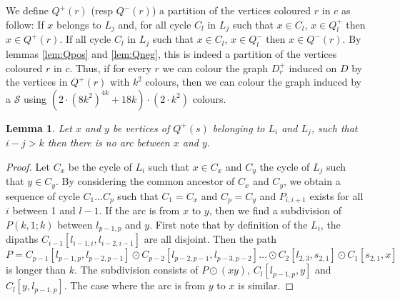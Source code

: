 \documentclass[utf8,10pt]{article}
\theoremstyle{plain}
\newtheorem{lemma}[theorem]{Lemma}
\theoremstyle{definition}
\theoremstyle{remark}
\newcommand{\dr}{ k^2}
\newcommand{\col}{(8k^2)^{4k}}
\begin{document}
%
We define $Q^+(r)$ (resp $Q^-(r)$) a partition of the vertices coloured $r$ in $c$ as follow:
If $x$ belongs to $L_j$ and, for all cycle $C_l$ in $L_j$ such that $x \in C_l$, $x \in Q^+_l$ then $x \in Q^+(r)$.
If all cycle $C_l$ in $L_j$ such that $x \in C_l$, $x \in Q^-_l$ then $x \in Q^-(r)$.
By lemmas \ref{lem:Qpos} and \ref{lem:Qneg}, this is indeed a partition of the vertices coloured $r$ in $c$.
Thus, if for every $r$ we can colour the graph $D_r^+$ induced on $D$ by the vertices in 
$Q^+(r)$ with $\dr$ colours, then we can colour the graph induced by a $\mathcal{S}$ using 
$(2\cdot \col + 18k) \cdot (2 \cdot \dr)$ colours.  


\begin{lemma}\label{lem:lvl}
Let $x$ and $y$ be vertices of $Q^+(s)$ belonging to $L_i$ and $L_j$, such that $i-j> k$ then there is no arc between $x$ and $y$.
\end{lemma}

\begin{proof}
Let $C_x$ be the cycle of $L_i$ such that $x \in C_x$ and $C_y$ the cycle of $L_j$ such that $y \in C_y$.
By considering the common ancestor of $C_x$ and $C_y$, we obtain a sequence of cycle $C_1 \dots C_p$ such that $C_1 = C_x$ and $C_p = C_y$
and $P_{i,i+1}$ exists for all $i$ between 1 and $l-1$.
If the arc is from $x$ to $y$, then we find a subdivision of $P(k,1;k)$ between $l_{p-1,p}$ and $y$. 
First note that by definition of the $L_i$, the dipaths $C_{i-1}[l_{i-1,i}, l_{i-2,i-1}]$ are all disjoint. 
Then the path $P = C_{p-1}[l_{p-1,p}, l_{p-2,p-1}] \odot C_{p-2}[l_{p-2,p-1}, l_{p-3,p-2}] \dots \odot C_{2}[l_{2,3}, s_{2,1}] 
\odot C_1[s_{2,1}, x]$ is longer than $k$. The subdivision consists of $P \odot (xy)$, $C_l[l_{p-1,p}, y]$ and $C_l[y,l_{p-1,p}]$.
The case where the arc is from $y$ to $x$ is similar.
\end{proof}
\end{document}
